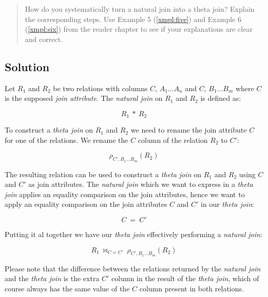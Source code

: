\documentclass[11pt]{article}
\begin{document}
\begin{quote}
How do you systematically turn a natural join into a theta join? Explain the corresponding steps. Use Example 5 (\ref{xmpl:five}) and Example 6 (\ref{xmpl:six}) from the reader chapter to see if your explanations are clear and correct.
\end{quote}

\subsection*{Solution}

Let $R_{1}$ and $R_{2}$ be two relations with columns $C$, $A_{1} \ldots A_{n}$ and $C$, $B_{1} \ldots B_{m}$ where $C$ is the supposed \emph{join attribute}. The \emph{natural join} on $R_{1}$ and $R_{2}$ is defined as:

\begin{displaymath}
R_{1} \ \ast \ R_{2}
\end{displaymath}

To construct a \emph{theta join} on $R_{1}$ and $R_{2}$ we need to rename the join attribute $C$ for one of the relations. We rename the $C$ column of the relation $R_{2}$ to $C'$:

\begin{displaymath}
\rho_{C',B_{1} \ldots B_{m}}(R_{2})
\end{displaymath}

The resulting relation can be used to construct a \emph{theta join} on $R_{1}$ and $R_{2}$ using $C$ and $C'$ as join attributes. The \emph{natural join} which we want to express in a \emph{theta join} applies an equality comparison on the join attributes, hence we want to apply an equality comparison on the join attributes $C$ and $C'$ in our \emph{theta join}:

\begin{displaymath}
C \ = \ C'
\end{displaymath}

Putting it al together we have our \emph{theta join} effectively performing a \emph{natural join}:

\begin{displaymath}
R_{1} \ \Join_{C=C'} \ \rho_{C',B_{1} \ldots B_{m}}(R_{2})
\end{displaymath}

Please note that the difference between the relations returned by the \emph{natural join} and the \emph{theta join} is the extra $C'$ column in the result of the \emph{theta join}, which of course always has the same value of the $C$ column present in both relations.
\end{document}

